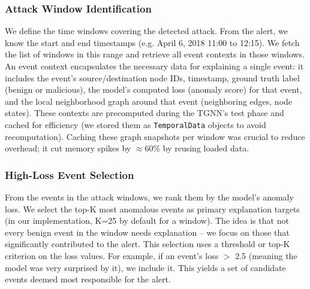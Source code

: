 \documentclass[conference]{IEEEtran}
\begin{document}
\subsubsection{Attack Window Identification}
We define the time windows covering the detected attack. From the alert, we know the start and end timestamps (e.g. April 6, 2018 11:00 to 12:15). We fetch the list of windows in this range and retrieve all event contexts in those windows. An event context encapsulates the necessary data for explaining a single event: it includes the event's source/destination node IDs, timestamp, ground truth label (benign or malicious), the model's computed loss (anomaly score) for that event, and the local neighborhood graph around that event (neighboring edges, node states). These contexts are precomputed during the TGNN's test phase and cached for efficiency (we stored them as \texttt{TemporalData} objects to avoid recomputation). Caching these graph snapshots per window was crucial to reduce overhead; it cut memory spikes by $\approx$60\% by reusing loaded data.

\subsubsection{High-Loss Event Selection}
From the events in the attack windows, we rank them by the model's anomaly loss. We select the top-K most anomalous events as primary explanation targets (in our implementation, K=25 by default for a window). The idea is that not every benign event in the window needs explanation -- we focus on those that significantly contributed to the alert. This selection uses a threshold or top-K criterion on the loss values. For example, if an event's loss $>$ 2.5 (meaning the model was very surprised by it), we include it. This yields a set of candidate events deemed most responsible for the alert.
\end{document}
